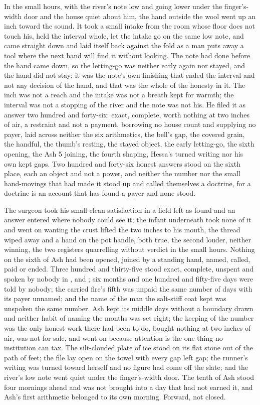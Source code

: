 In the small hours, with the river's note low and going lower under the finger's-width door and the house quiet about him, the hand outside the wool went up an inch toward the sound. It took a small intake from the room whose floor does not touch his, held the interval whole, let the intake go on the same low note, and came straight down and laid itself back against the fold as a man puts away a tool where the next hand will find it without looking. The note had done before the hand came down, so the letting-go was neither early again nor stayed, and the hand did not stay; it was the note's own finishing that ended the interval and not any decision of the hand, and that was the whole of the honesty in it. The inch was not a reach and the intake was not a breath kept for warmth; the interval was not a stopping of the river and the note was not his. He filed it as answer two hundred and forty-six: exact, complete, worth nothing at two inches of air, a restraint and not a payment, borrowing no house count and supplying no payer, laid across neither the six arithmetics, the bell's gap, the covered grain, the handful, the thumb's resting, the stayed object, the early letting-go, the sixth opening, the Ash 5 joining, the fourth shaping, Hessa's turned writing nor his own kept gaps. Two hundred and forty-six honest answers stood on the sixth place, each an object and not a power, and neither the number nor the small hand-movings that had made it stood up and called themselves a doctrine, for a doctrine is an account that has found a payer and none stood.

The surgeon took his small clean satisfaction in a field left as found and an answer entered where nobody could see it; the infant underneath took none of it and went on wanting the crust lifted the two inches to his mouth, the thread wiped away and a hand on the pot handle, both true, the second louder, neither winning, the two registers quarrelling without verdict in the small hours. Nothing on the sixth of Ash had been opened, joined by a standing hand, named, called, paid or ended. Three hundred and thirty-five stood exact, complete, unspent and spoken by nobody in ,  and ; six months and one hundred and fifty-five days were told by nobody; the carried fire's fifth was unpaid the same number of days with its payer unnamed; and the name of the man the salt-stiff coat kept was unspoken the same number. Ash kept its middle days without a boundary drawn and neither habit of naming the months was set right; the keeping of the number was the only honest work there had been to do, bought nothing at two inches of air, was not for sale, and went on because attention is the one thing no institution can tax. The silt-clouded plate of ice stood on its flat stone out of the path of feet; the file lay open on the towel with every gap left gap; the runner's writing was turned toward herself and no figure had come off the slate; and the river's low note went quiet under the finger's-width door. The tenth of Ash stood four mornings ahead and was not brought into a day that had not earned it, and Ash's first arithmetic belonged to its own morning. Forward, not closed.
